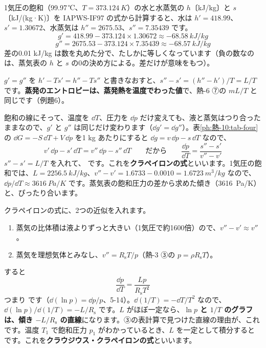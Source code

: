 \begin{phmijika}[蒸気表で確かめる]
1気圧の飽和（99.97\,℃、$T=\qty{373.124}{K}$）の水と水蒸気の $h$〔kJ/kg〕と $s$〔kJ/(kg·K)〕を IAPWS-IF97 の式から計算すると、水は $h'=418.99$、$s'=1.30672$、水蒸気は $h''=2675.53$、$s''=7.35439$ です。
\[g'=418.99-373.124\times1.30672\approx\qty{-68.58}{kJ/kg}\]
\[g''=2675.53-373.124\times7.35439\approx\qty{-68.57}{kJ/kg}\]
差の0.01 kJ/kg は数を丸めた分で、たしかに等しくなっています（負の数なのは、蒸気表の $h$ と $s$ の0の決め方による。差だけが意味をもつ）。
\end{phmijika}

$g'=g''$ を $h'-Ts'=h''-Ts''$ と書きなおすと、$s''-s'=(h''-h')/T=L/T$ です。\textbf{蒸発のエントロピーは、蒸発熱を温度でわった値}で、熱-6 ⑦の $mL/T$ と同じです（例題6）。

飽和の線にそって、温度を $\dd T$、圧力を $\dd p$ だけ変えても、液と蒸気はつり合ったままなので、$g'$ と $g''$ は同じだけ変わります（$\dd g'=\dd g''$）。表\ref{ph:熱-10:tab-four}の $\dd G=-S\,\dd T+V\,\dd p$ を1 kg あたりにすると $\dd g=v\,\dd p-s\,\dd T$ なので、
\[v'\,\dd p-s'\,\dd T=v''\,\dd p-s''\,\dd T\qquad\text{だから}\qquad\frac{\dd p}{\dd T}=\frac{s''-s'}{v''-v'}\]
$s''-s'=L/T$ を入れて、
です。これを\textbf{クラペイロンの式}といいます。1気圧の飽和では、$L=\qty{2256.5}{kJ/kg}$、$v''-v'=1.6733-0.0010=\qty{1.6723}{m^3/kg}$ なので、$\dd p/\dd T\approx\qty{3616}{Pa/K}$ です。蒸気表の飽和圧力の差から求めた傾き（\qty{3616}{Pa/K}）と、ぴったり合います。

クラペイロンの式に、2つの近似を入れます。
\begin{enumerate}[label={\bkcircled{\arabic*}}, leftmargin=2.4\zw, itemsep=1pt, topsep=2pt]
\item 蒸気の比体積は液よりずっと大きい（1気圧で約1600倍）ので、$v''-v'\approx v''$。
\item 蒸気を理想気体とみなし、$v''=R_{\mathrm s}T/p$（熱-3 ③の $p=\rho R_{\mathrm s}T$）。
\end{enumerate}
すると
\[\frac{\dd p}{\dd T}=\frac{Lp}{R_{\mathrm s}T^2}\]
つまり
です（$\dd(\ln p)=\dd p/p$、5-14）。$\dd(1/T)=-\dd T/T^2$ なので、$\dd(\ln p)/\dd(1/T)=-L/R_{\mathrm s}$ です。$L$ がほぼ一定なら、\textbf{$\ln p$ と $1/T$ のグラフは、傾き $-L/R_{\mathrm s}$ の直線}になります。③の表計算で見つけた直線の理由が、これです。温度 $T_1$ で飽和圧力 $p_1$ がわかっているとき、$L$ を一定として積分すると
です。これを\textbf{クラウジウス・クラペイロンの式}といいます。

